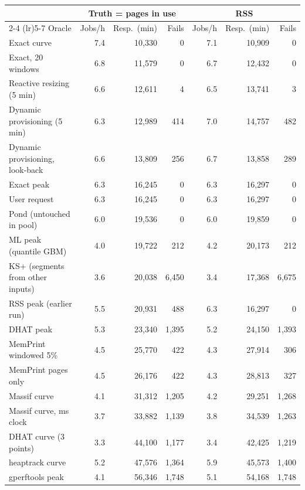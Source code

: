 \begin{tabular}{lrrrrrr}
\toprule
 & \multicolumn{3}{c}{Truth = pages in use} & \multicolumn{3}{c}{RSS} \\
\cmidrule(lr){2-4} \cmidrule(lr){5-7}
Oracle & Jobs/h & Resp.\ (min) & Fails & Jobs/h & Resp.\ (min) & Fails \\
\midrule
Exact curve & 7.4 & 10{,}330 & 0 & 7.1 & 10{,}909 & 0 \\
Exact, 20 windows & 6.8 & 11{,}579 & 0 & 6.7 & 12{,}432 & 0 \\
Reactive resizing (5 min) & 6.6 & 12{,}611 & 4 & 6.5 & 13{,}741 & 3 \\
Dynamic provisioning (5 min) & 6.3 & 12{,}989 & 414 & 7.0 & 14{,}757 & 482 \\
Dynamic provisioning, look-back & 6.6 & 13{,}809 & 256 & 6.7 & 13{,}858 & 289 \\
Exact peak & 6.3 & 16{,}245 & 0 & 6.3 & 16{,}297 & 0 \\
User request & 6.3 & 16{,}245 & 0 & 6.3 & 16{,}297 & 0 \\
Pond (untouched in pool) & 6.0 & 19{,}536 & 0 & 6.0 & 19{,}859 & 0 \\
ML peak (quantile GBM) & 4.0 & 19{,}722 & 212 & 4.2 & 20{,}173 & 212 \\
KS+ (segments from other inputs) & 3.6 & 20{,}038 & 6{,}450 & 3.4 & 17{,}368 & 6{,}675 \\
RSS peak (earlier run) & 5.5 & 20{,}931 & 488 & 6.3 & 16{,}297 & 0 \\
DHAT peak & 5.3 & 23{,}340 & 1{,}395 & 5.2 & 24{,}150 & 1{,}393 \\
MemPrint windowed 5\% & 4.5 & 25{,}770 & 422 & 4.3 & 27{,}914 & 306 \\
MemPrint pages only & 4.5 & 26{,}176 & 422 & 4.3 & 28{,}813 & 327 \\
Massif curve & 4.1 & 31{,}312 & 1{,}205 & 4.2 & 29{,}251 & 1{,}268 \\
Massif curve, ms clock & 3.7 & 33{,}882 & 1{,}139 & 3.8 & 34{,}539 & 1{,}263 \\
DHAT curve (3 points) & 3.3 & 44{,}100 & 1{,}177 & 3.4 & 42{,}425 & 1{,}219 \\
heaptrack curve & 5.2 & 47{,}576 & 1{,}364 & 5.9 & 45{,}573 & 1{,}400 \\
gperftools peak & 4.1 & 56{,}346 & 1{,}748 & 5.1 & 54{,}168 & 1{,}748 \\
\bottomrule
\end{tabular}
